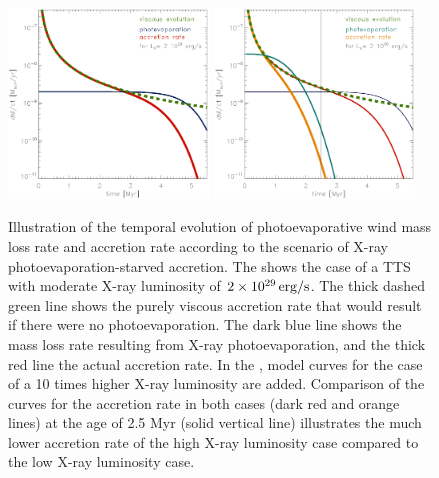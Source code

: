 \documentclass[10pt,fleqn,twoside,a4paper]{article}
\begin{document}
\begin{figure} %
\centering
\includegraphics[width=0.475\textwidth]{model1.ps}\hspace{5mm}
\includegraphics[width=0.475\textwidth]{model2.ps}
\caption{Illustration of the temporal evolution of photoevaporative wind
mass loss rate and accretion rate according to the scenario of
X-ray photoevaporation-starved accretion.
The  shows the case of a TTS with moderate X-ray luminosity
of $2 \times 10^{29}\,\rm erg/s$. The thick dashed green line shows the
purely viscous accretion rate that would result if there were
no photoevaporation. The dark blue line shows the mass loss rate resulting
from X-ray photoevaporation, and the thick red line the actual accretion rate.
\newline
In the , model curves for the case of a 10 times
higher X-ray luminosity are added.
Comparison of the curves for the accretion rate in both cases
(dark red and orange lines) at the age of 2.5 Myr (solid vertical line)
illustrates the much lower accretion rate
of the high X-ray luminosity case compared to the low  X-ray luminosity case.
\label{PSA_prediction.fig}}
\end{figure} %
\end{document}
